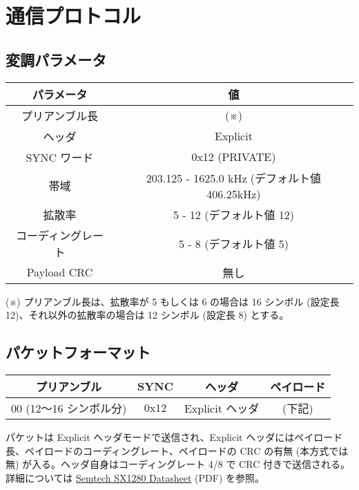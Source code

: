 \documentclass[a4j,oneside]{ujbook}
\begin{document}
\section*{通信プロトコル}

\subsection*{変調パラメータ}
\begin{center}
 \begin{tabular}{|c|c|}
  \hline
  {パラメータ} & {値} \\
  \hline
  {プリアンブル長} & {(※)} \\
  {ヘッダ} & {Explicit} \\
  {SYNC ワード} & {0x12 (PRIVATE)} \\
  {帯域} & {203.125 - 1625.0 kHz (デフォルト値 406.25kHz)} \\
  {拡散率} & {5 - 12 (デフォルト値 12)} \\
  {コーディングレート} & {5 - 8 (デフォルト値 5)} \\
  {Payload CRC} & {無し} \\
  \hline
 \end{tabular}
\end{center}

(※) プリアンブル長は、拡散率が 5 もしくは 6 の場合は 16 シンボル (設定長 12)、それ以外の拡散率の場合は 12 シンボル (設定長 8) とする。

\subsection*{パケットフォーマット}

\begin{center}
 \begin{tabular}{|c|c|c|c|}
  \hline
  {プリアンブル} & {SYNC} & {ヘッダ} & {ペイロード} \\
  \hline
  {00 (12〜16 シンボル分)} & {0x12} & {Explicit ヘッダ} & {(下記)} \\
  \hline
 \end{tabular}
\end{center}

パケットは Explicit ヘッダモードで送信され、Explicit ヘッダにはペイロード長、ペイロードのコーディングレート、ペイロードの CRC の有無 (本方式では無) が入る。ヘッダ自身はコーディングレート 4/8 で CRC 付きで送信される。詳細については \href{https://semtech.my.salesforce.com/sfc/p/E0000000JelG/a/2R000000HoCW/8EVYKPLcthcKCB_cKzApAc6Xf6tAHtn9.UKcOh7SNmg}{Semtech SX1280 Datasheet} (PDF) を参照。
\end{document}

